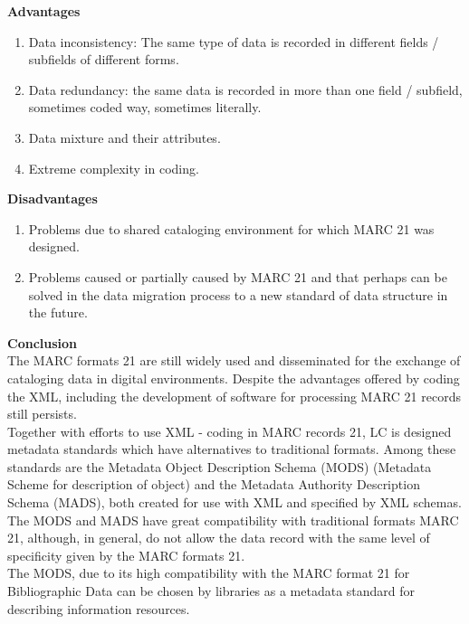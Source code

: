 \begin{enumerate}
	{\bf Advantages}
	\begin{enumerate}
		\item Data inconsistency: The same type of data is recorded in different fields / subfields of different forms.
		\item Data redundancy: the same data is recorded in more than one field / subfield, sometimes coded way, sometimes literally.	
		\item Data mixture and their attributes.
		\item Extreme complexity in coding.
	\end{enumerate}	
	{\bf Disadvantages}
	\begin{enumerate}
		\item Problems due to shared cataloging environment for which MARC 21 was designed.
		\item Problems caused or partially caused by MARC 21 and that perhaps can be solved in the data migration process to a new standard of data structure in the future.
	\end{enumerate}
	{\bf Conclusion}\\
	The MARC formats 21 are still widely used and disseminated for the exchange of cataloging data in digital environments. Despite the advantages offered by coding the XML, including the development of software for processing MARC 21 records still persists.\\
	Together with efforts to use XML - coding in MARC records 21, LC is designed metadata standards which have alternatives to traditional formats. Among these standards are the Metadata Object Description Schema (MODS) (Metadata Scheme for description of object) and the Metadata Authority Description Schema (MADS), both created for use with XML and specified by XML schemas.\\
	The MODS and MADS have great compatibility with traditional formats MARC 21, although, in general, do not allow the data record with the same level of specificity given by the MARC formats 21.\\
	The MODS, due to its high compatibility with the MARC format 21 for Bibliographic Data can be chosen by libraries as a metadata standard for describing information resources.


\end{enumerate}
